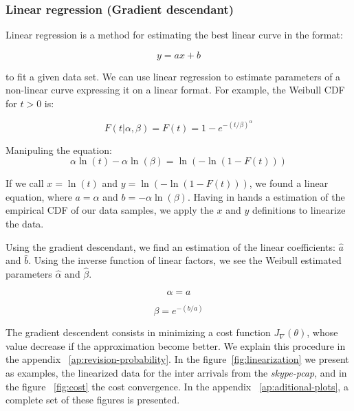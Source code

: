 
\subsubsection{Linear regression (Gradient descendant)}

Linear regression is a method for estimating the best linear curve in the format:

\begin{equation}
y = ax + b
\end{equation}

to fit a given data set. We can use linear regression to estimate parameters of a non-linear curve expressing it on a linear format. For example, the Weibull CDF for $t > 0$ is:

\begin{equation}
F(t|\alpha, \beta) = F(t) = 1 - e^{-(t/\beta)^{\alpha}}
\end{equation}

Manipuling the equation:
\begin{equation}
\alpha\ln{(t)} - \alpha\ln{(\beta)} = \ln{(-\ln{(1 - F(t))})}
\end{equation}


If we call $x = \ln{(t)}$ and $y = \ln{(-\ln{(1 - F(t))})}$, we found a linear equation, where $a = \alpha$ and $b = -\alpha\ln{(\beta)}$. Having in hands a estimation of the empirical CDF of our data samples, we apply the $x$ and $y$ definitions to linearize the data. 

Using the gradient descendant, we find an estimation of the linear coefficients: $\hat{a}$ and $\hat{b}$. Using the inverse function of linear factors, we see the Weibull estimated parameters $\hat{\alpha}$ and $\hat{\beta}$.

\begin{equation}
\alpha = a
\end{equation}

\begin{equation}
\beta = e^{-(b/a)}
\end{equation}

The gradient descendent consists in minimizing a cost function $J_\nabla(\theta)$, whose value decrease if the approximation become better. We explain this procedure in the appendix ~\ref{ap:revision-probability}. In the figure~\ref{fig:linearization} we present as examples, the linearized data for the inter arrivals from the \textit{skype-pcap}, and in the figure ~\ref{fig:cost} the cost convergence. In the appendix ~\ref{ap:aditional-plots}, a complete set of these figures is presented.

